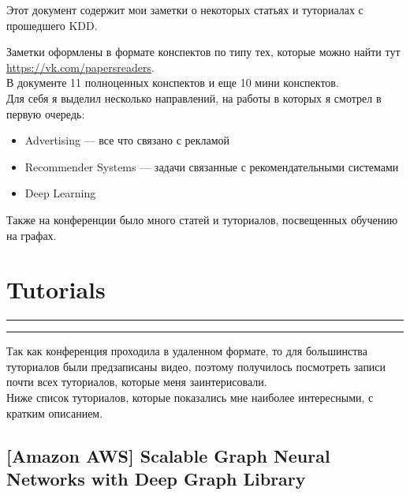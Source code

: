 Этот документ содержит мои заметки о некоторых статьях и туториалах с прошедшего KDD.

Заметки оформлены в формате конспектов по типу тех, которые можно найти тут \url{https://vk.com/papersreaders}. \\

В документе 11 полноценных конспектов и еще 10 мини конспектов. \\

Для себя я выделил несколько направлений, на работы в которых я смотрел в первую очередь:
\begin{itemize}
    \item Advertising --- все что связано с рекламой
    \item Recommender Systems --- задачи связанные с рекомендательными системами
    \item Deep Learning
\end{itemize}

Также на конференции было много статей и туториалов, посвещенных обучению на графах.

\chapter{Tutorials}
\textcolor{black}{\hrule height 0.5 pt}
\vspace{8pt}
\startcontents
{}
\textcolor{black}{\hrule height 0.5 pt}
\par\bigskip

Так как конференция проходила в удаленном формате, то для большинства туториалов были предзаписаны видео, поэтому получилось посмотреть записи почти всех туториалов, которые меня заинтерисовали. \\

Ниже список туториалов, которые показались мне наиболее интересными, с кратким описанием.





\section{[Amazon AWS] Scalable Graph Neural Networks with Deep Graph Library} 

